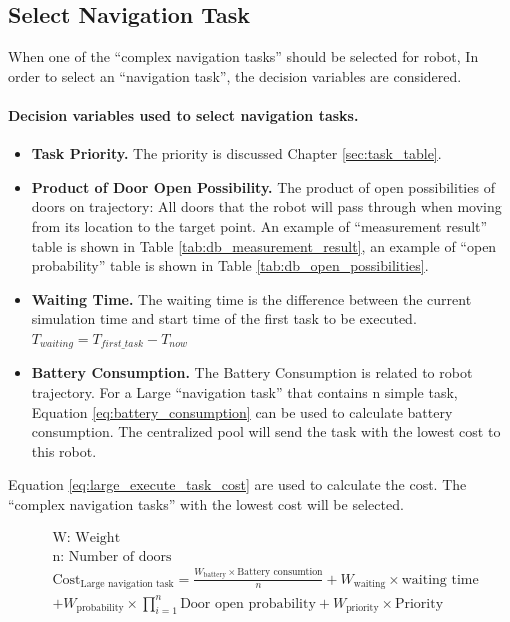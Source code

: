 \subsection{Select Navigation Task}
\label{sec:select_navigation_task}
When one of the ``complex navigation tasks'' should be selected for robot, In order to select an ``navigation task'', the decision variables are considered. 
\paragraph{Decision variables used to select navigation tasks.}
\begin{itemize}
\item \textbf{Task Priority.} The priority is discussed Chapter \ref{sec:task_table}.
\item \textbf{Product of Door Open Possibility.} The product of open possibilities of doors on trajectory: All doors that the robot will pass through when moving from its location to the target point.
 An example of ``measurement result'' table is shown in Table \ref{tab:db_measurement_result}, an example of ``open probability'' table is shown in Table \ref{tab:db_open_possibilities}. 
\item \textbf{Waiting Time. } The waiting time is the difference between the current simulation time and start time of the first task to be executed. $T_{waiting} = T_{first\_task} - T_{now}$
\item \textbf{Battery Consumption.} The Battery Consumption is related to robot trajectory. For a Large ``navigation task'' that contains n simple task, Equation \ref{eq:battery_consumption} can be used to calculate battery consumption. The centralized pool will send the task with the lowest cost to this robot.
\end{itemize}

Equation \ref{eq:large_execute_task_cost} are used to calculate the cost. The ``complex navigation tasks'' with the lowest cost will be selected.

\begin{equation}
 \label{eq:large_execute_task_cost} 
 \begin{aligned}
 & \mbox{W: Weight } \\
 & \mbox{n: Number of doors} \\
 & \mbox{Cost}_{\mbox{Large navigation task}} = \frac{W_{\mbox{battery}} \times \mbox{Battery consumtion}}{n} + W_{\mbox{waiting}} \times \mbox{waiting time} \\
 & + W_{\mbox{probability}} \times \prod\limits_{i=1}^n \mbox{Door open probability} + W_{\mbox{priority}} \times \mbox{Priority}
 \end{aligned}
\end{equation}




